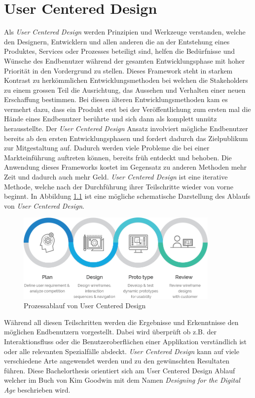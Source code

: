 \chapter{User Centered Design}
\label{sec:usercentric}
Als \textit{User Centered Design} werden Prinzipien und Werkzeuge verstanden, welche den Designern, Entwicklern und allen anderen die an der Entstehung eines Produktes, Services oder Prozesses beteiligt sind, helfen die Bedürfnisse und Wünsche des Endbenutzer während der gesamten Entwicklungsphase mit hoher Priorität in den Vordergrund zu stellen. Dieses Framework steht in starkem Kontrast zu herkömmlichen Entwicklungsmethoden bei welchen die Stakeholders zu einem grossen Teil die Ausrichtung, das Aussehen und Verhalten einer neuen Erschaffung bestimmen. Bei diesen älteren Entwicklungsmethoden kam es vermehrt dazu, dass ein Produkt erst bei der Veröffentlichung zum ersten mal die Hände eines Endbenutzer berührte und sich dann als komplett unnütz herausstellte. Der \textit{User Centered Design} Ansatz involviert mögliche Endbenutzer bereits ab den ersten Entwicklungsphasen und fordert dadurch das Zielpublikum zur Mitgestaltung auf. Dadurch werden viele Probleme die bei einer Markteinführung auftreten können, bereits früh entdeckt und behoben. Die Anwendung dieses Frameworks kostet im Gegensatz zu anderen Methoden mehr Zeit und dadurch auch mehr Geld. \textit{User Centered Design} ist eine iterative Methode, welche nach der Durchführung ihrer Teilschritte wieder von vorne beginnt. In Abbildung \ref{fig:usercentereddesign} ist eine mögliche schematische Darstellung des Ablaufs von \textit{User Centered Design}.

\begin{figure}[ht]
	\centering
  \includegraphics[width=0.88\textwidth]{images/userCenteredDesign.png}
	\caption{Prozessablauf von User Centered Design}
	\label{fig:usercentereddesign}
\end{figure}

Während all diesen Teilschritten werden die Ergebnisse und Erkenntnisse den möglichen Endbenutzern vorgestellt. Dabei wird überprüft ob z.B. der Interaktionsfluss oder die Benutzeroberflächen einer Applikation verständlich ist oder alle relevanten Spezialfälle abdeckt. \textit{User Centered Design} kann auf viele verschiedene Arte angewendet werden und zu den gewünschten Resultaten führen. Diese Bachelorthesis orientiert sich am User Centered Design Ablauf welcher im Buch von Kim Goodwin mit dem Namen \textit{Designing for the Digital Age}\citep{goodwin2011designing} beschrieben wird.


